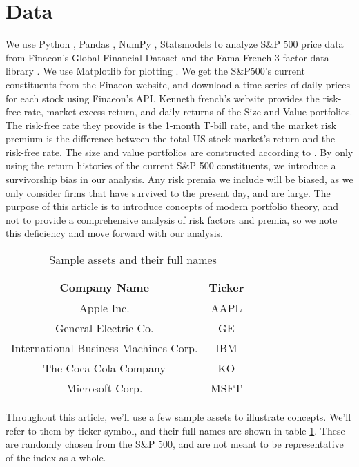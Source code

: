 \section{Data}
\label{sec:data}
We use Python \citep{python3}, Pandas \citep{reback2020pandas}, NumPy \citep{harris2020array}, Statsmodels \citep{seabold2010statsmodels} to analyze S\&P 500 price data from Finaeon's Global Financial Dataset \citep{finaeon} and the Fama-French 3-factor data library \citep{french_website}. 
We use Matplotlib for plotting \citep{Hunter2007}.
We get the S\&P500's current constituents from the Finaeon website, and download a time-series of daily prices for each stock using Finaeon's API. 
Kenneth french's website \citep{french_website} provides the risk-free rate, market excess return, and daily returns of the Size and Value portfolios. 
The risk-free rate they provide is the 1-month T-bill rate, and the market risk premium is the difference between the total US stock market's return and the risk-free rate.
The size and value portfolios are constructed according to \citet{fama_french_1993}.
By only using the return histories of the current S\&P 500 constituents, we introduce a survivorship bias in our analysis. Any risk premia we include will be biased, as we only consider firms that have survived to the present day, and are large.
The purpose of this article is to introduce concepts of modern portfolio theory, and not to provide a comprehensive analysis of risk factors and premia, so we
note this deficiency and move forward with our analysis.

\begin{table}
    \centering
    \begin{tabular}{|c|c|c|}
        \hline
        \textbf{Company Name} & \textbf{Ticker}\\
        \hline
        Apple Inc. & AAPL\\
        General Electric Co. & GE\\
        International Business Machines Corp. & IBM\\
        The Coca-Cola Company & KO\\
        Microsoft Corp. & MSFT\\
        \hline
    \end{tabular}
    \caption{Sample assets and their full names}
    \label{tab:sample_assets_w_names}
\end{table}

Throughout this article, we'll use a few sample assets to illustrate concepts. We'll refer to them by ticker symbol, and their full names are shown in table \ref{tab:sample_assets_w_names}.
These are randomly chosen from the S\&P 500, and are not meant to be representative of the index as a whole.

